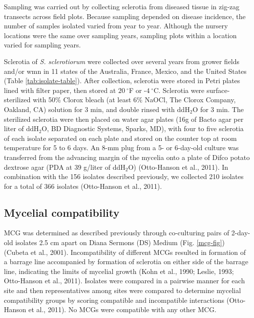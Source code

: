 \documentclass[fleqn,10pt,lineno]{wlpeerj} %
\theoremstyle{definition}
\theoremstyle{definition}
\theoremstyle{definition}
\theoremstyle{remark}
\begin{document}
Sampling was carried out by collecting sclerotia from diseased tissue in
zig-zag transects across field plots. Because sampling depended on
disease incidence, the number of samples isolated varied from year to
year. Although the nursery locations were the same over sampling years,
sampling plots within a location varied for sampling years.

Sclerotia of \emph{S. sclerotiorum} were collected over several years
from grower fields and/or wmn in 11 states of the Australia, France,
Mexico, and the United States (Table \ref{tab:isolate-table}). After
collection, sclerotia were stored in Petri plates lined with filter
paper, then stored at \(20~^{\circ}\)F or -\(4~^{\circ}\)C. Sclerotia
were surface-sterilized with 50\% Clorox bleach (at least 6\% NaOCl, The
Clorox Company, Oakland, CA) solution for 3 min, and double rinsed with
ddH\(_2\)O for 3 min. The sterilized sclerotia were then placed on water
agar plates (16g of Bacto agar per liter of ddH\(_2\)O, BD Diagnostic
Systems, Sparks, MD), with four to five sclerotia of each isolate
separated on each plate and stored on the counter top at room
temperature for 5 to 6 days. An 8-mm plug from a 5- or 6-day-old culture
was transferred from the advancing margin of the mycelia onto a plate of
Difco potato dextrose agar (PDA at 39 g/liter of ddH\(_2\)O)
(Otto-Hanson et al., 2011). In combination with the 156 isolates
described previously, we collected 210 isolates for a total of 366
isolates (Otto-Hanson et al., 2011).

\subsection*{Mycelial compatibility}\label{mycelial-compatibility}

MCG was determined as described previously through co-culturing pairs of
2-day-old isolates 2.5 cm apart on Diana Sermons (DS) Medium (Fig.
\ref{mcg-fig}) (Cubeta et al., 2001). Incompatibility of different MCGs
resulted in formation of a barrage line accompanied by formation of
sclerotia on either side of the barrage line, indicating the limits of
mycelial growth (Kohn et al., 1990; Leslie, 1993; Otto-Hanson et al.,
2011). Isolates were compared in a pairwise manner for each site and
then representatives among sites were compared to determine mycelial
compatibility groups by scoring compatible and incompatible interactions
(Otto-Hanson et al., 2011). No MCGs were compatible with any other MCG.
\end{document}
